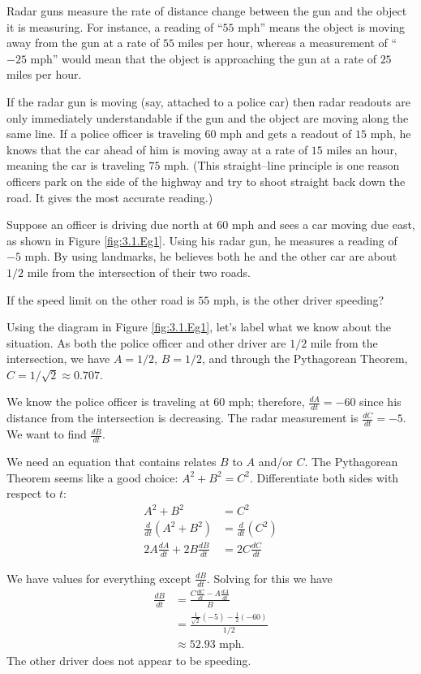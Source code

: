 \begin{example} \label{Ex:3.1.Eg1}
Radar guns measure the rate of distance change between the gun and the object it is measuring. For instance, a reading of ``$55$ mph'' means the object is moving away from the gun at a rate of $55$ miles per hour, whereas a measurement of ``$-25$ mph'' would mean that the object is approaching the gun at a rate of $25$ miles per hour.

If the radar gun is moving (say, attached to a police car) then radar readouts are only immediately understandable if the gun and the object are moving along the same line. If a police officer is traveling $60$ mph and gets a readout of $15$ mph, he knows that the car ahead of him is moving away at a rate of $15$ miles an hour, meaning the car is traveling $75$ mph. (This straight--line principle is one reason officers park on the side of the highway and try to shoot straight back down the road. It gives the most accurate reading.)

Suppose an officer is driving due north at $60$ mph and sees a car moving due east, as shown in Figure \ref{fig:3.1.Eg1}. Using his radar gun, he measures a reading of $-5$ mph. By using landmarks, he believes both he and the other car are about $1/2$ mile from the intersection of their two roads. 

If the speed limit on the other road is $55$ mph, is the other driver speeding?

\solution Using the diagram in Figure \ref{fig:3.1.Eg1}, let's label what we know about the situation. As both the police officer and other driver are $1/2$ mile from the intersection, we have $A = 1/2$, $B = 1/2$, and through the Pythagorean Theorem, $C = 1/\sqrt{2}\approx 0.707$. 

We know the police officer is traveling at $60$ mph; therefore, $\frac{dA}{dt} = -60$ since his distance from the intersection is decreasing. The radar measurement is $\frac{dC}{dt} = -5$. We want to find $\frac{dB}{dt}$. 

We need an equation that contains relates $B$ to $A$ and/or $C$. The Pythagorean Theorem seems like a good choice: $A^2+B^2 = C^2$. Differentiate both sides with respect to $t$:
\begin{align*}
A^2 + B^2 &= C^2 \\
\frac{d}{dt}\left(A^2+B^2\right) &= \frac{d}{dt}\left(C^2\right) \\
2A\frac{dA}{dt} + 2B\frac{dB}{dt} &= 2C\frac{dC}{dt}
\end{align*}

We have values for everything except $\frac{dB}{dt}$. Solving for this we have 
\begin{align*}
\frac{dB}{dt} &= \frac{C\frac{dC}{dt}- A\frac{dA}{dt}}{B} \\
&= \frac{ \frac{1}{\sqrt{2}}(-5)  - \frac{1}{2}(-60) }{1/2}\\
&\approx 52.93\text{ mph}.
\end{align*}
The other driver does not appear to be speeding.	
\end{example}